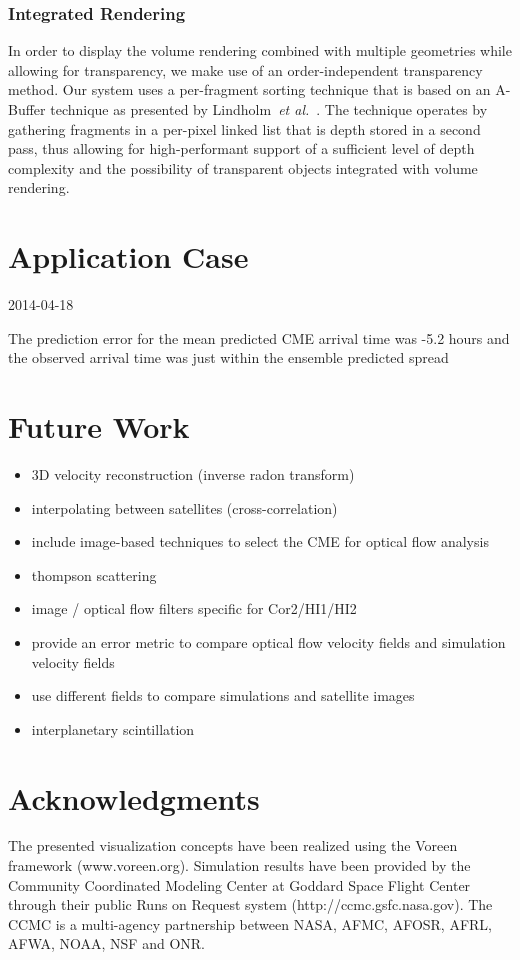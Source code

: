 \documentclass[journal]{vgtc}                %
\def\etal{\textit{et al.}}
\def\etal{\textit{et al.}}
\begin{document}
\subsubsection{Integrated Rendering} \label{sec:integration}
In order to display the volume rendering combined with multiple geometries while allowing for transparency, we make use of an order-independent transparency method. Our system uses a per-fragment sorting technique that is based on an A-Buffer technique as presented by Lindholm~\etal~\cite{Lindholm:2014fm}. The technique operates by gathering fragments in a per-pixel linked list that is depth stored in a second pass, thus allowing for high-performant support of a sufficient level of depth complexity and the possibility of transparent objects integrated with volume rendering. 

\section{Application Case}
2014-04-18

The prediction error for the mean predicted CME arrival time was -5.2 hours and the observed arrival time was just within the ensemble predicted spread


\section{Future Work} \label{sec:futurework}
\begin{itemize}
\item 3D velocity reconstruction (inverse radon transform)
\item interpolating between satellites (cross-correlation)
\item include image-based techniques to select the CME for optical flow analysis
\item thompson scattering
\item image / optical flow filters specific for Cor2/HI1/HI2
\item provide an error metric to compare optical flow velocity fields and simulation velocity fields
\item use different fields to compare simulations and satellite images
\item interplanetary scintillation
\end{itemize}

\section*{Acknowledgments}
The presented visualization concepts have been realized using the Voreen framework (www.voreen.org). Simulation results have been provided by the Community Coordinated Modeling Center at Goddard Space Flight Center through their public Runs on Request system (http://ccmc.gsfc.nasa.gov). The CCMC is a multi-agency partnership between NASA, AFMC, AFOSR, AFRL, AFWA, NOAA, NSF and ONR.




\end{document}
